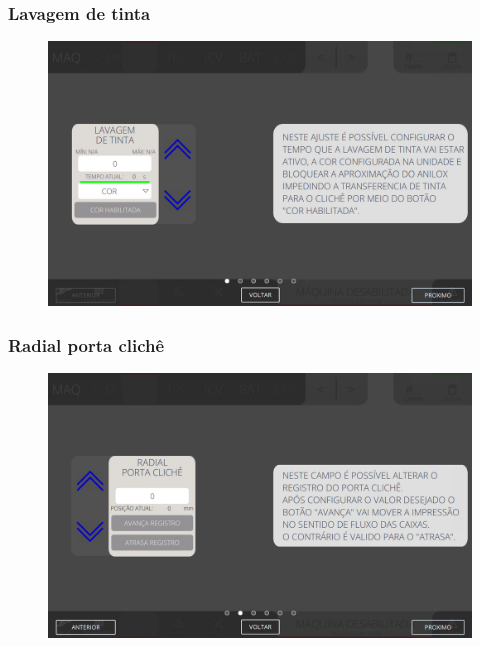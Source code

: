\subsubsection{\small{Lavagem de tinta}} \label{sec:telaConfiguracoesImpressoraLavagemDeTinta}
\vspace*{\fill}
\begin{figure}[h]
    \centering
    \includegraphics[width=576 px,height=360 px]{src/imagesICV/04-printters/02-printter/settings/e-1.png}
\end{figure}
\vspace*{\fill}

\newpage
\thispagestyle{fancy}
\vspace*{\fill}
\subsubsection{\small{Radial porta clichê}} \label{sec:telaConfiguracoesImpressoraRadialPortaCliche}
\vspace*{\fill}
\begin{figure}[h]
    \centering
    \includegraphics[width=576 px,height=360 px]{src/imagesICV/04-printters/02-printter/settings/e-2.png}
\end{figure}
\vspace*{\fill}


